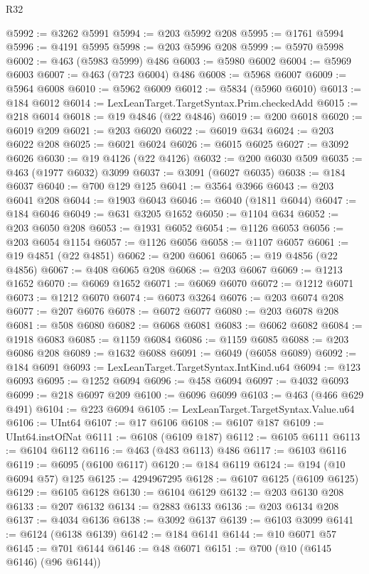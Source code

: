 \begin{lexlean}{R32}
\begin{coremodule}
@5992 := @3262 @5991
@5994 := @203 @5992 @208
@5995 := @1761 @5994
@5996 := @4191 @5995
@5998 := @203 @5996 @208
@5999 := @5970 @5998
@6002 := @463 (@5983 @5999) @486
@6003 := @5980 @6002
@6004 := @5969 @6003
@6007 := @463 (@723 @6004) @486
@6008 := @5968 @6007
@6009 := @5964 @6008
@6010 := @5962 @6009
@6012 := @5834 (@5960 @6010)
@6013 := @184 @6012
@6014 := LexLeanTarget.TargetSyntax.Prim.checkedAdd
@6015 := @218 @6014
@6018 := @19 @4846 (@22 @4846)
@6019 := @200 @6018
@6020 := @6019 @209
@6021 := @203 @6020
@6022 := @6019 @634
@6024 := @203 @6022 @208
@6025 := @6021 @6024
@6026 := @6015 @6025
@6027 := @3092 @6026
@6030 := @19 @4126 (@22 @4126)
@6032 := @200 @6030 @509
@6035 := @463 (@1977 @6032) @3099
@6037 := @3091 (@6027 @6035)
@6038 := @184 @6037
@6040 := @700 @129 @125
@6041 := @3564 @3966
@6043 := @203 @6041 @208
@6044 := @1903 @6043
@6046 := @6040 (@1811 @6044)
@6047 := @184 @6046
@6049 := @631 @3205 @1652
@6050 := @1104 @634
@6052 := @203 @6050 @208
@6053 := @1931 @6052
@6054 := @1126 @6053
@6056 := @203 @6054 @1154
@6057 := @1126 @6056
@6058 := @1107 @6057
@6061 := @19 @4851 (@22 @4851)
@6062 := @200 @6061
@6065 := @19 @4856 (@22 @4856)
@6067 := @408 @6065 @208
@6068 := @203 @6067
@6069 := @1213 @1652
@6070 := @6069 @1652
@6071 := @6069 @6070
@6072 := @1212 @6071
@6073 := @1212 @6070
@6074 := @6073 @3264
@6076 := @203 @6074 @208
@6077 := @207 @6076
@6078 := @6072 @6077
@6080 := @203 @6078 @208
@6081 := @508 @6080
@6082 := @6068 @6081
@6083 := @6062 @6082
@6084 := @1918 @6083
@6085 := @1159 @6084
@6086 := @1159 @6085
@6088 := @203 @6086 @208
@6089 := @1632 @6088
@6091 := @6049 (@6058 @6089)
@6092 := @184 @6091
@6093 := LexLeanTarget.TargetSyntax.IntKind.u64
@6094 := @123 @6093
@6095 := @1252 @6094
@6096 := @458 @6094
@6097 := @4032 @6093
@6099 := @218 @6097 @209
@6100 := @6096 @6099
@6103 := @463 (@466 @629 @491)
@6104 := @223 @6094
@6105 := LexLeanTarget.TargetSyntax.Value.u64
@6106 := UInt64
@6107 := @17 @6106
@6108 := @6107 @187
@6109 := UInt64.instOfNat
@6111 := @6108 (@6109 @187)
@6112 := @6105 @6111
@6113 := @6104 @6112
@6116 := @463 (@483 @6113) @486
@6117 := @6103 @6116
@6119 := @6095 (@6100 @6117)
@6120 := @184 @6119
@6124 := @194 (@10 @6094 @57) @125
@6125 := 4294967295
@6128 := @6107 @6125 (@6109 @6125)
@6129 := @6105 @6128
@6130 := @6104 @6129
@6132 := @203 @6130 @208
@6133 := @207 @6132
@6134 := @2883 @6133
@6136 := @203 @6134 @208
@6137 := @4034 @6136
@6138 := @3092 @6137
@6139 := @6103 @3099
@6141 := @6124 (@6138 @6139)
@6142 := @184 @6141
@6144 := @10 @6071 @57
@6145 := @701 @6144
@6146 := @48 @6071
@6151 := @700 (@10 (@6145 @6146) (@96 @6144))

\end{coremodule}
\end{lexlean}
